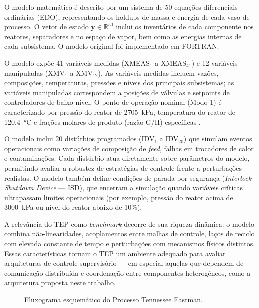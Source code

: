 O modelo matemático é descrito por um sistema de 50 equações diferenciais ordinárias (EDO), representando os holdups de massa e energia de cada vaso de processo. O vetor de estado $\mathbf{y} \in \mathbb{R}^{50}$ inclui os inventários de cada componente nos reatores, separadores e no espaço de vapor, bem como as energias internas de cada subsistema. O modelo original foi implementado em FORTRAN.

O modelo expõe 41 variáveis medidas (XMEAS$_1$ a XMEAS$_{41}$) e 12 variáveis manipuladas (XMV$_1$ a XMV$_{12}$). As variáveis medidas incluem vazões, composições, temperaturas, pressões e níveis dos principais subsistemas; as variáveis manipuladas correspondem a posições de válvulas e setpoints de controladores de baixo nível. O ponto de operação nominal (Modo 1) é caracterizado por pressão do reator de 2705~kPa, temperatura do reator de 120,4~°C e frações molares de produto (razão G/H) específicas \cite{DOWNS1993}.

O modelo inclui 20 distúrbios programados (IDV$_1$ a IDV$_{20}$) que simulam eventos operacionais como variações de composição de \textit{feed}, falhas em trocadores de calor e contaminações. Cada distúrbio atua diretamente sobre parâmetros do modelo, permitindo avaliar a robustez de estratégias de controle frente a perturbações realistas. O modelo também define condições de parada por segurança (\textit{Interlock Shutdown Device} — ISD), que encerram a simulação quando variáveis críticas ultrapassam limites operacionais (por exemplo, pressão do reator acima de 3000~kPa ou nível do reator abaixo de 10\%).

A relevância do TEP como \textit{benchmark} decorre de sua riqueza dinâmica: o modelo combina não-linearidades, acoplamentos entre malhas de controle, laços de reciclo com elevada constante de tempo e perturbações com mecanismos físicos distintos. Essas características tornam o TEP um ambiente adequado para avaliar arquiteturas de controle supervisório — em especial aquelas que dependem de comunicação distribuída e coordenação entre componentes heterogêneos, como a arquitetura proposta neste trabalho.

\begin{figure}[htbp]
	\centering
	\caption{Fluxograma esquemático do Processo Tennessee Eastman.}
	\label{fig:tep_flowsheet}
\end{figure}


